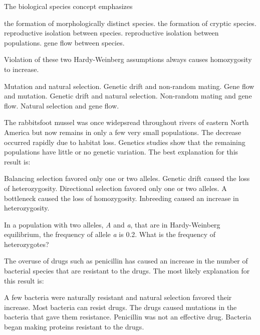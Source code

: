 
\question
The biological species concept emphasizes

\begin{choices}
\choice the formation of morphologically distinct species.
\choice the formation of cryptic species.
\correctchoice reproductive isolation between species.
\choice reproductive isolation between populations.
\choice gene flow between species.
\end{choices}

\question
Violation of these two Hardy-Weinberg assumptions always causes homozygosity to increase.

\begin{choices}
\choice Mutation and natural selection.
\correctchoice Genetic drift and non-random mating.
\choice Gene flow and mutation.
\choice Genetic drift and natural selection.
\choice Non-random mating and gene flow.
\choice Natural selection and gene flow.
\end{choices}

\question
The rabbitsfoot mussel was once widepsread throughout rivers of eastern North America but now remains in only a few very small populations. The decrease occurred rapidly due to habitat loss. Genetics studies show that the remaining populations have little or no genetic variation. The best explanation for this result is:

\begin{choices}
\choice Balancing selection favored only one or two alleles. 
\correctchoice Genetic drift caused the loss of heterozygosity. 
\choice Directional selection favored only one or two alleles. 
\choice A bottleneck caused the loss of homozygosity. 
\choice Inbreeding caused an increase in heterozygosity. 
\end{choices}

\question
In a population with two alleles, \textit{A} and \textit{a}, that are in Hardy-Weinberg equilibrium, the frequency of allele \textit{a} is 0.2. What is the frequency of heterozygotes? 

\begin{choices}
\end{choices}

\question
The overuse of drugs such as penicillin has caused an increase in the number of bacterial species that are resistant to the drugs. The most likely explanation for this result is:

\begin{choices}
\correctchoice A few bacteria were naturally resistant and natural selection favored their increase. 
\choice Most bacteria can resist drugs. 
\choice The drugs caused mutations in the bacteria that gave them resistance. 
\choice Penicillin was not an effective drug. 
\choice Bacteria began making proteins resistant to the drugs. 
\end{choices}

